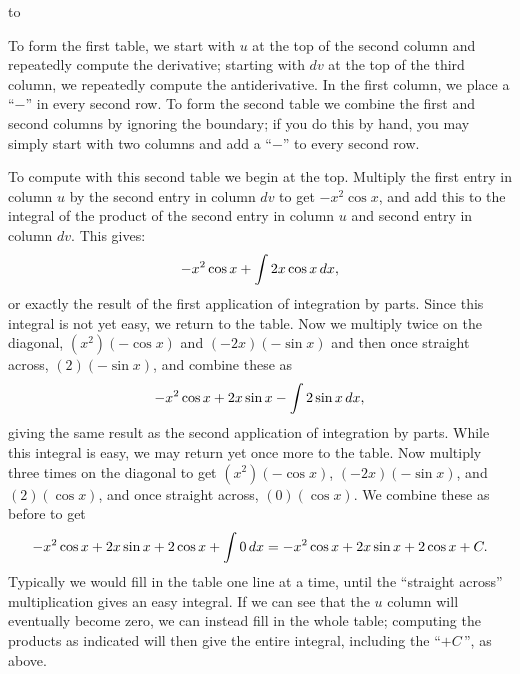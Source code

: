 \null
\hbox to

To form the first table, we start with $u$ at the top of the second
column and repeatedly compute the derivative; starting with $dv$ at
the top of the third column, we repeatedly compute the
antiderivative. In the first column, we place a ``$-$'' in every
second row. To form the 
second table we combine the first and second columns by
ignoring the boundary; if you do this by hand, you may simply start
with two columns and add a ``$-$'' to every second row.

To compute with this second table we begin at the top. Multiply the
first entry in column $u$ by the second entry in column $dv$ to get
$-x^2\cos x$, and add this to the integral of the product of the
second entry in column $u$ and second entry in column $dv$.  This
gives:
$$-x^2\cos x+\int 2x\cos x\, d x,$$
or exactly the result of the first application of integration by
parts.  Since this integral is not yet easy, we return to the table.
Now we multiply twice on the diagonal, $(x^2)(-\cos x)$ and
$(-2x)(-\sin x)$ and then once straight across, $(2)(-\sin x)$, and
combine these as
$$-x^2\cos x+2x\sin x-\int 2\sin x\, d x,$$
giving the same result as the second application of integration by
parts. While this integral is easy, we may return yet once more to the
table. Now multiply three times on the diagonal to get $
(x^2)(-\cos x)$, $(-2x)(-\sin x)$, and $(2)(\cos x)$, and once
straight across, $(0)(\cos x)$. We combine these as before to get
$$
  -x^2\cos x+2x\sin x +2\cos x+\int 0\, d x=
  -x^2\cos x+2x\sin x +2\cos x+C.
$$
Typically we would fill in the table one line at a time, until the
``straight across'' multiplication gives an easy integral. If we can
see that the $u$ column will eventually become zero, we can instead
fill in the whole table; computing the products as indicated will then
give the entire integral, including the ``$+C\,$'', as above.

